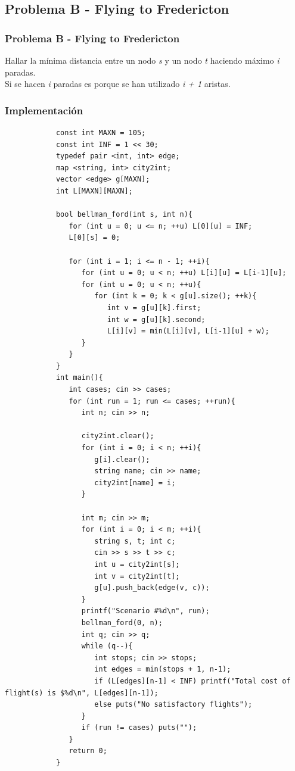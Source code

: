 \documentclass{beamer}
\begin{document}
	\subsection{Problema B - Flying to Fredericton}
	\begin{frame}
		\frametitle{Problema B - Flying to Fredericton}
		Hallar la mínima distancia entre un nodo \emph{s} y un nodo \emph{t} haciendo máximo \emph{i} paradas.\\
		Si se hacen \emph{i} paradas es porque se han utilizado \emph{i + 1} aristas.\\
	\end{frame}
	
	\begin{frame}
		\frametitle{Implementación}
		\begin{lstlisting}
			const int MAXN = 105;
			const int INF = 1 << 30;
			typedef pair <int, int> edge;
			map <string, int> city2int;
			vector <edge> g[MAXN];
			int L[MAXN][MAXN];

			bool bellman_ford(int s, int n){
			   for (int u = 0; u <= n; ++u) L[0][u] = INF;
			   L[0][s] = 0;

			   for (int i = 1; i <= n - 1; ++i){
			      for (int u = 0; u < n; ++u) L[i][u] = L[i-1][u];
			      for (int u = 0; u < n; ++u){
			         for (int k = 0; k < g[u].size(); ++k){
			            int v = g[u][k].first;
			            int w = g[u][k].second;
			            L[i][v] = min(L[i][v], L[i-1][u] + w);
			      }
			   }
			}
			int main(){
			   int cases; cin >> cases;
			   for (int run = 1; run <= cases; ++run){
			      int n; cin >> n;

			      city2int.clear();
			      for (int i = 0; i < n; ++i){
			         g[i].clear();
			         string name; cin >> name;
			         city2int[name] = i;
			      }

			      int m; cin >> m;
			      for (int i = 0; i < m; ++i){
			         string s, t; int c;
			         cin >> s >> t >> c;
			         int u = city2int[s];
			         int v = city2int[t];
			         g[u].push_back(edge(v, c));
			      }
			      printf("Scenario #%d\n", run);
			      bellman_ford(0, n);
			      int q; cin >> q;
			      while (q--){
			         int stops; cin >> stops;
			         int edges = min(stops + 1, n-1);
			         if (L[edges][n-1] < INF) printf("Total cost of                   flight(s) is $%d\n", L[edges][n-1]);
			         else puts("No satisfactory flights");
			      }
			      if (run != cases) puts("");
			   }
			   return 0;
			}
		\end{lstlisting}
	\end{frame}
	
\end{document}
